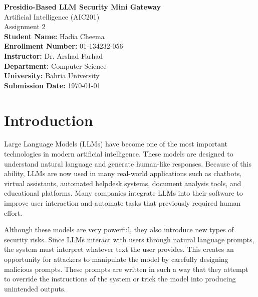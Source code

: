 \documentclass[conference]{IEEEtran}
\begin{document}
\begin{center}

{\LARGE \textbf{Presidio-Based LLM Security Mini Gateway}} \\[0.5cm]

{\large Artificial Intelligence (AIC201)} \\[0.2cm]

{\large Assignment 2} \\[0.8cm]

\textbf{Student Name:} Hadia Cheema \\[0.2cm]

\textbf{Enrollment Number:} 01-134232-056 \\[0.2cm]

\textbf{Instructor:} Dr. Arshad Farhad \\[0.2cm]

\textbf{Department:} Computer Science \\[0.2cm]

\textbf{University:} Bahria University \\[0.2cm]

\textbf{Submission Date:} \today

\end{center}

\vspace{1cm}

\section{Introduction}


Large Language Models (LLMs) have become one of the most important technologies in modern artificial intelligence. These models are designed to understand natural language and generate human-like responses. Because of this ability, LLMs are now used in many real-world applications such as chatbots, virtual assistants, automated helpdesk systems, document analysis tools, and educational platforms. Many companies integrate LLMs into their software to improve user interaction and automate tasks that previously required human effort.

Although these models are very powerful, they also introduce new types of security risks. Since LLMs interact with users through natural language prompts, the system must interpret whatever text the user provides. This creates an opportunity for attackers to manipulate the model by carefully designing malicious prompts. These prompts are written in such a way that they attempt to override the instructions of the system or trick the model into producing unintended outputs.
\end{document}
